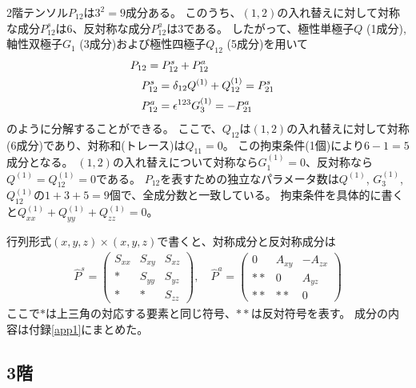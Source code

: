 \documentclass[11pt]{easymemo}
\begin{document}
2階テンソル$P_{12}$は$3^2=9$成分ある。
このうち、$(1,2)$の入れ替えに対して対称な成分$P^s_{12}$は6、反対称な成分$P_{12}^a$は3である。
したがって、極性単極子$Q$ (1成分), 軸性双極子$G_1$ (3成分)および極性四極子$Q_{12}$ (5成分)を用いて
\begin{align}
&
P_{12}=P_{12}^s+P_{12}^a
\cr&\quad
P_{12}^s=\delta_{12}Q^{(1)}+Q_{12}^{(1)}=P_{21}^s
\cr&\quad
P_{12}^a=\epsilon^{123}G_3^{(1)}=-P_{21}^a
\label{decomp2}
\end{align}
のように分解することができる。
ここで、$Q_{12}$は$(1,2)$の入れ替えに対して対称(6成分)であり、対称和(トレース)は$Q_{11}=0$。
この拘束条件(1個)により$6-1=5$成分となる。
$(1,2)$の入れ替えについて対称なら$G_1^{(1)}=0$、反対称なら$Q^{(1)}=Q_{12}^{(1)}=0$である。
$P_{12}$を表すための独立なパラメータ数は$Q^{(1)}$, $G_3^{(1)}$, $Q_{12}^{(1)}$の$1+3+5=9$個で、全成分数と一致している。
拘束条件を具体的に書くと$Q_{xx}^{(1)}+Q_{yy}^{(1)}+Q_{zz}^{(1)}=0$。

行列形式$(x,y,z)\times(x,y,z)$で書くと、対称成分と反対称成分は
\begin{align}
\hat{P}^s=
\begin{pmatrix}
S_{xx} & S_{xy} & S_{xz} \\
* & S_{yy} & S_{yz} \\
* & * & S_{zz}
\end{pmatrix},
\quad
\hat{P}^a=\begin{pmatrix}
0 & A_{xy} & -A_{zx} \\
** & 0 & A_{yz} \\
** & ** & 0
\end{pmatrix}
\end{align}
ここで$*$は上三角の対応する要素と同じ符号、$**$は反対符号を表す。
成分の内容は付録\ref{app1}にまとめた。


\subsection{3階}
\end{document}

